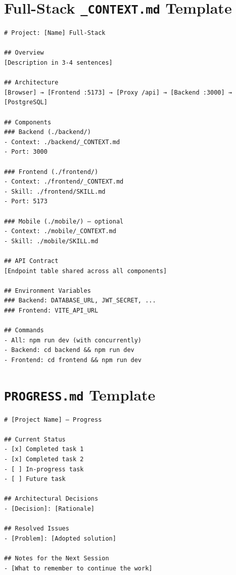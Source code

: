 \section{Full-Stack \texttt{\_CONTEXT.md} Template}

\begin{lstlisting}[language={},title={\_CONTEXT.md --- Full-stack template}]
# Project: [Name] Full-Stack

## Overview
[Description in 3-4 sentences]

## Architecture
[Browser] → [Frontend :5173] → [Proxy /api] → [Backend :3000] → [PostgreSQL]

## Components
### Backend (./backend/)
- Context: ./backend/_CONTEXT.md
- Port: 3000

### Frontend (./frontend/)
- Context: ./frontend/_CONTEXT.md
- Skill: ./frontend/SKILL.md
- Port: 5173

### Mobile (./mobile/) — optional
- Context: ./mobile/_CONTEXT.md
- Skill: ./mobile/SKILL.md

## API Contract
[Endpoint table shared across all components]

## Environment Variables
### Backend: DATABASE_URL, JWT_SECRET, ...
### Frontend: VITE_API_URL

## Commands
- All: npm run dev (with concurrently)
- Backend: cd backend && npm run dev
- Frontend: cd frontend && npm run dev
\end{lstlisting}

\section{\texttt{PROGRESS.md} Template}

\begin{lstlisting}[language={},title={PROGRESS.md --- Session memory template}]
# [Project Name] — Progress

## Current Status
- [x] Completed task 1
- [x] Completed task 2
- [ ] In-progress task
- [ ] Future task

## Architectural Decisions
- [Decision]: [Rationale]

## Resolved Issues
- [Problem]: [Adopted solution]

## Notes for the Next Session
- [What to remember to continue the work]
\end{lstlisting}

